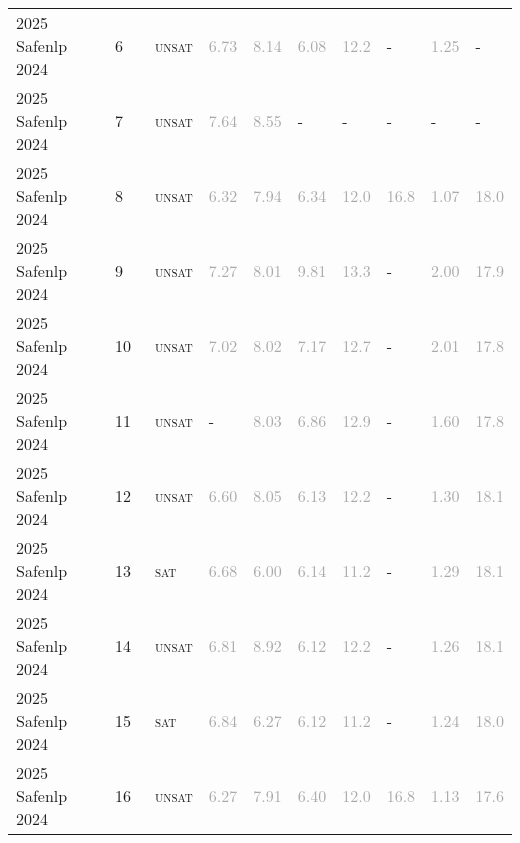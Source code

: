 \begin{center}
{\begin{longtable}{@{}llllllllll@{}}
2025 Safenlp 2024 & 6 & ~\textsc{unsat} & \textcolor{darkgray}{6.73} & \textcolor{darkgray}{8.14} & \textcolor{darkgray}{6.08} & \textcolor{darkgray}{12.2} & - & \textcolor{darkgray}{1.25} & - \\
2025 Safenlp 2024 & 7 & ~\textsc{unsat} & \textcolor{darkgray}{7.64} & \textcolor{darkgray}{8.55} & - & - & - & - & - \\
2025 Safenlp 2024 & 8 & ~\textsc{unsat} & \textcolor{darkgray}{6.32} & \textcolor{darkgray}{7.94} & \textcolor{darkgray}{6.34} & \textcolor{darkgray}{12.0} & \textcolor{darkgray}{16.8} & \textcolor{darkgray}{1.07} & \textcolor{darkgray}{18.0} \\
2025 Safenlp 2024 & 9 & ~\textsc{unsat} & \textcolor{darkgray}{7.27} & \textcolor{darkgray}{8.01} & \textcolor{darkgray}{9.81} & \textcolor{darkgray}{13.3} & - & \textcolor{darkgray}{2.00} & \textcolor{darkgray}{17.9} \\
2025 Safenlp 2024 & 10 & ~\textsc{unsat} & \textcolor{darkgray}{7.02} & \textcolor{darkgray}{8.02} & \textcolor{darkgray}{7.17} & \textcolor{darkgray}{12.7} & - & \textcolor{darkgray}{2.01} & \textcolor{darkgray}{17.8} \\
2025 Safenlp 2024 & 11 & ~\textsc{unsat} & - & \textcolor{darkgray}{8.03} & \textcolor{darkgray}{6.86} & \textcolor{darkgray}{12.9} & - & \textcolor{darkgray}{1.60} & \textcolor{darkgray}{17.8} \\
2025 Safenlp 2024 & 12 & ~\textsc{unsat} & \textcolor{darkgray}{6.60} & \textcolor{darkgray}{8.05} & \textcolor{darkgray}{6.13} & \textcolor{darkgray}{12.2} & - & \textcolor{darkgray}{1.30} & \textcolor{darkgray}{18.1} \\
2025 Safenlp 2024 & 13 & ~\textsc{sat} & \textcolor{darkgray}{6.68} & \textcolor{darkgray}{6.00} & \textcolor{darkgray}{6.14} & \textcolor{darkgray}{11.2} & - & \textcolor{darkgray}{1.29} & \textcolor{darkgray}{18.1} \\
2025 Safenlp 2024 & 14 & ~\textsc{unsat} & \textcolor{darkgray}{6.81} & \textcolor{darkgray}{8.92} & \textcolor{darkgray}{6.12} & \textcolor{darkgray}{12.2} & - & \textcolor{darkgray}{1.26} & \textcolor{darkgray}{18.1} \\
2025 Safenlp 2024 & 15 & ~\textsc{sat} & \textcolor{darkgray}{6.84} & \textcolor{darkgray}{6.27} & \textcolor{darkgray}{6.12} & \textcolor{darkgray}{11.2} & - & \textcolor{darkgray}{1.24} & \textcolor{darkgray}{18.0} \\
2025 Safenlp 2024 & 16 & ~\textsc{unsat} & \textcolor{darkgray}{6.27} & \textcolor{darkgray}{7.91} & \textcolor{darkgray}{6.40} & \textcolor{darkgray}{12.0} & \textcolor{darkgray}{16.8} & \textcolor{darkgray}{1.13} & \textcolor{darkgray}{17.6} \\

\end{longtable}}
\end{center}
